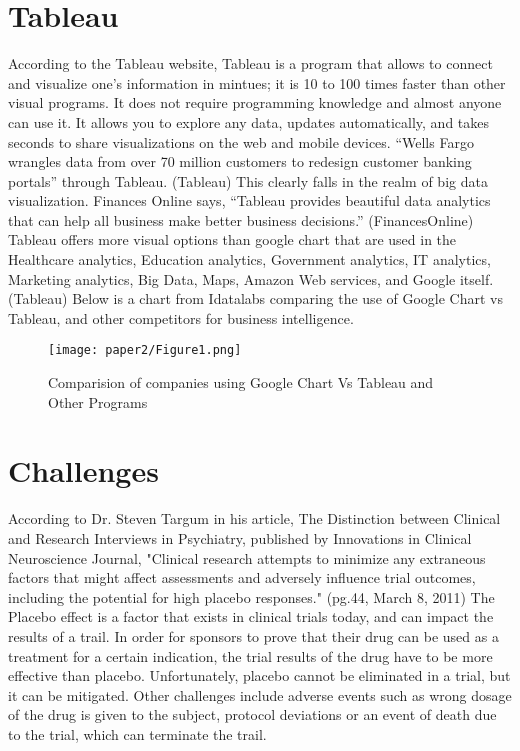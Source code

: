 \documentclass[sigconf]{acmart}
\begin{document}
\section{Tableau}
According to the Tableau website, Tableau is a program that allows to connect and visualize one’s information in mintues; it is 10 to 100 times faster than other visual programs. It does not require programming knowledge and almost anyone can use it. It allows you to explore any data, updates automatically, and takes seconds to share visualizations on the web and mobile devices. “Wells Fargo wrangles data from over 70 million customers to redesign customer banking portals” through Tableau. (Tableau) This clearly falls in the realm of big data visualization. Finances Online says, “Tableau provides beautiful data analytics that can help all business make better business decisions.” (FinancesOnline) Tableau offers more visual options than google chart that are used in the Healthcare analytics, Education analytics, Government analytics, IT analytics, Marketing analytics, Big Data, Maps, Amazon Web services, and Google itself. (Tableau) Below is a chart from Idatalabs comparing the use of Google Chart vs Tableau, and other competitors for business intelligence. 

\begin{figure}[htb]
  \centering
  \texttt{[image: paper2/Figure1.png]}
  \caption{Comparision of companies using Google Chart Vs Tableau and Other Programs
  \cite{Idatalabs}}
  \label{fig:Figure 1} 
\end{figure}

\section{Challenges}

According to Dr. Steven Targum in his article, The Distinction between Clinical and Research Interviews in Psychiatry, published by Innovations in Clinical Neuroscience Journal, "Clinical research attempts to minimize any extraneous factors that might affect assessments and adversely influence trial outcomes, including the potential for high placebo responses." (pg.44, March 8, 2011) 
The Placebo effect is a factor that exists in clinical trials today, and can impact the results of a trail. 
In order for sponsors to prove that their drug can be used as a treatment for a certain indication, the trial results of the drug have to be more effective than placebo. Unfortunately, placebo cannot be eliminated in a trial, but it can be mitigated. 
Other challenges include adverse events such as wrong dosage of the drug is given to the subject, protocol deviations or an event of death due to the trial, which can terminate the trail. 
\end{document}

